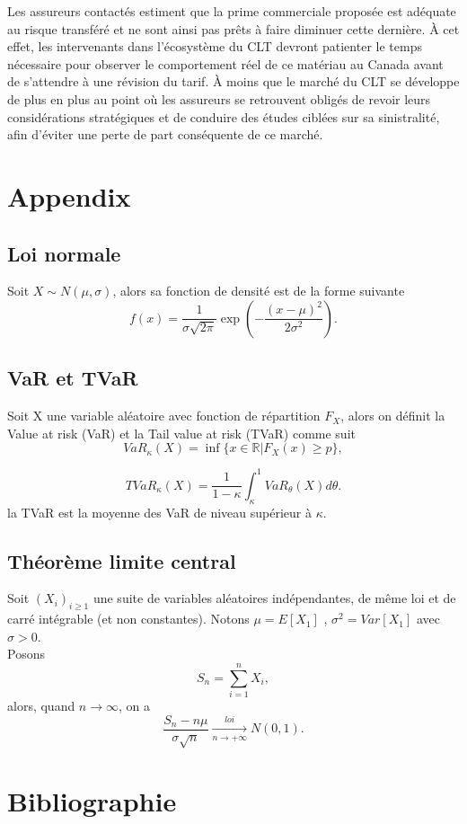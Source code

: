 \documentclass[11pt]{article}
\begin{document}
Les assureurs contactés estiment que la prime commerciale proposée est adéquate au risque transféré et ne sont ainsi pas prêts à faire diminuer cette dernière. À cet effet, les intervenants dans l’écosystème du CLT devront patienter le temps nécessaire pour observer le comportement réel de ce matériau au Canada avant de s’attendre à une révision du tarif. À moins que le marché du CLT se développe de plus en plus au point où les assureurs se retrouvent obligés de revoir leurs considérations stratégiques et de conduire des études ciblées sur sa sinistralité, afin d'éviter une perte de part conséquente de ce marché.

\newpage

\appendix
 \section{Appendix}
\subsection{Loi normale}
Soit $X \sim N(\mu,\sigma)$, alors sa fonction de densité est de la forme suivante
\begin{equation}
f(x)=\frac{1}{\sigma\sqrt{2\pi}} \exp\left(-\frac{(x-\mu)^{2}}{2\sigma^{2}}\right). \nonumber
\end{equation}

\subsection{VaR et TVaR}

Soit X une variable aléatoire avec fonction de répartition $F_{X}$, alors on définit la Value at risk (VaR) et la Tail value at risk (TVaR) comme suit 
\begin{equation}
VaR_{\kappa}(X)=\inf\lbrace x \in \mathbb{R}|F_{X}(x)\geq p\rbrace,\nonumber
\end{equation}

\begin{equation}
TVaR_{\kappa}(X)=\frac{1}{1-\kappa} \int_{\kappa}^{1} VaR_{\theta}(X)d\theta.\nonumber
\end{equation}
la TVaR est la moyenne des VaR de niveau supérieur à $\kappa$.

\subsection{Théorème limite central}

Soit $(X_{i})_{i \geq 1}$ une suite de variables aléatoires indépendantes, de même loi et de carré intégrable (et non constantes). Notons $\mu = E[X_{1}]$ , $\sigma^{2} = Var[X_{1}]$ avec $\sigma>0$.\\
Posons 
\begin{equation}
S_{n}=\sum_{i=1}^{n} X_{i}, \nonumber
\end{equation}
alors, quand $n\rightarrow\infty$, on a
\begin{equation}
\frac{S_{n}-n\mu}{\sigma \sqrt{n}}\underset{n \to +\infty}{\overset{loi}{\longrightarrow}} N(0,1). \nonumber
\end{equation}


\newpage
\section*{Bibliographie}


\end{document}
